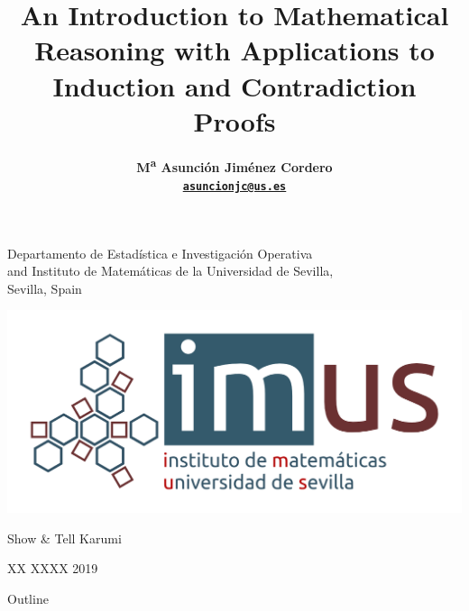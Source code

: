 \documentclass[11pt,a4paper,xcolor=dvipsnames, leqno]{beamer}
\title[Introduction to Mathematical
Reasoning. Induction \& Contradiction Proofs]{An Introduction to Mathematical
Reasoning with Applications to
Induction and Contradiction Proofs}
\author[M\textsuperscript{a} Asunci\'on Jim\'enez Cordero]
{{{\bf M\textsuperscript{a} Asunci\'on Jim\'enez Cordero\\
{\href{mailto:asuncionjc@us.es}{\tt asuncionjc@us.es}}}}}
\institute{Show & Tell Karumi} %
\date{}
\begin{document}
\begingroup 
    \begin{frame}
        \titlepage
\begin{center}
\insertauthor\par
\end{center}
\begin{center}
        \scriptsize Departamento de Estad\'istica e Investigaci\'on Operativa\\ and Instituto de Matem\'aticas de la Universidad de Sevilla,\\
        Sevilla, Spain
        \end{center}
        
\vspace*{0.3cm}
\begin{center}
\includegraphics[scale=0.35]{imus_basico_oct.png}
\end{center}
\begin{center}
\scriptsize{Show \& Tell Karumi}
\end{center}
\begin{center}
\footnotesize{XX XXXX 2019}
\end{center}
\end{frame}
\endgroup





\begin{without_headline}
    \begin{frame}{Outline} %
        \tableofcontents
    \end{frame}
\end{without_headline}
\end{document}
